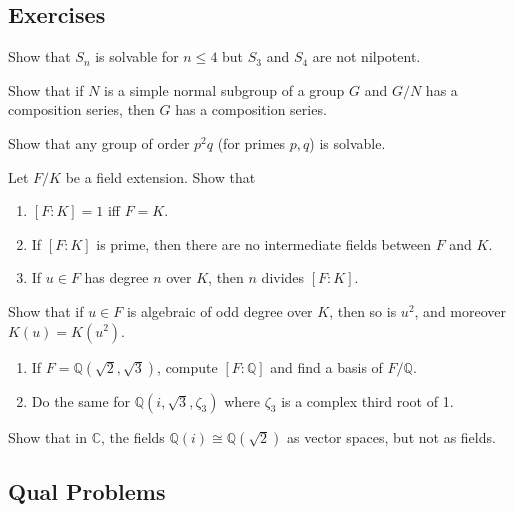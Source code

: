 
\subsection{Exercises}
\begin{problem}[Hungerford 2.7.10]
\label{prob:1.1}
Show that $S_n$ is solvable for $n\leq 4$ but $S_3$ and $S_4$ are not nilpotent.
\end{problem}

\begin{problem}[Hungerford 2.8.3]
\label{prob:1.1}
Show that if $N$ is a simple normal subgroup of a group $G$ and $G/N$ has a composition series, then $G$ has a composition series.
\end{problem}

\begin{problem}[Hungerford 2.8.9]
\label{prob:1.1}
Show that any group of order $p^2 q$ (for primes $p,q$) is solvable.
\end{problem}

\begin{problem}[Hungerford 5.1.1]
Let $F/K$ be a field extension. Show that
\begin{enumerate}
    \item $[F: K] = 1$ iff $F = K$.
    \item If $[F: K]$ is prime, then there are no intermediate fields between $F$ and $K$.
    \item If $u\in F$ has degree $n$ over $K$, then $n$ divides $[F: K]$.
\end{enumerate}
\label{prob:1.1}
\end{problem}

\begin{problem}[Hungerford 5.1.8]
\label{prob:1.1}
Show that if $u\in F$ is algebraic of odd degree over $K$, then so is $u^2$, and moreover $K(u) = K(u^2)$.
\end{problem}

\begin{problem}[Hungerford 5.1.14]
\begin{enumerate}
    \item If $F = \mathbb{Q}(\sqrt 2, \sqrt 3)$, compute $[F: \mathbb{Q}]$ and find a basis of $F/\mathbb{Q}$.
    \item Do the same for $\mathbb{Q}(i, \sqrt 3, \zeta_3)$ where $\zeta_3$ is a complex third root of 1.
\end{enumerate}
\label{prob:1.1}
\end{problem}

\begin{problem}[Hungerford 5.1.16]
Show that in $\mathbb{C}$, the fields $\mathbb{Q}(i) \cong \mathbb{Q}(\sqrt 2)$ as vector spaces, but not as fields.
\label{prob:1.1}
\end{problem}

\subsection{Qual Problems}